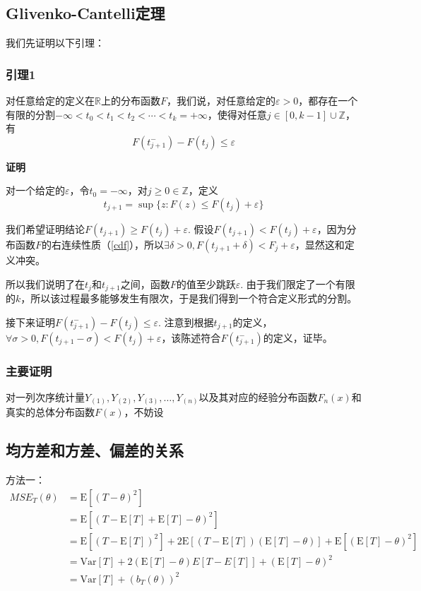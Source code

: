\documentclass[UTF8]{ctexbook}
\begin{document}
\subsection{Glivenko-Cantelli定理}
\label{proof:glivenko-cantelli}
我们先证明以下引理：

\subsubsection{引理1}

对任意给定的定义在$\mathbb{R}$上的分布函数$F$，我们说，对任意给定的$\varepsilon>0$，都存在一个有限的分割$-\infty<t_0<t_1<t_2<\cdots<t_k=+\infty$，使得对任意$j\in[0,k-1]\cup\mathbb{Z}$，有
\[
	F(t_{j+1}^-)-F(t_j)\leq\varepsilon
\]

\noindent\textbf{证明}

对一个给定的$\varepsilon$，令$t_0=-\infty$，对$j\geq0\in\mathbb{Z}$，定义
\[
	t_{j+1}=\sup\{z:F(z)\leq F(t_j)+\varepsilon\}
\]

我们希望证明结论$F(t_{j+1})\geq F(t_j)+\varepsilon$. 假设$F(t_{j+1})< F(t_j)+\varepsilon$，因为分布函数$F$的右连续性质（\ref{cdf}），所以$\exists\delta>0,F(t_{j+1}+\delta)<F_j+\varepsilon$，显然这和定义冲突。

所以我们说明了在$t_{j}$和$t_{j+1}$之间，函数$F$的值至少跳跃$\varepsilon$. 由于我们限定了一个有限的$k$，所以该过程最多能够发生有限次，于是我们得到一个符合定义形式的分割。

接下来证明$F(t_{j+1}^-)-F(t_j)\leq\varepsilon$. 注意到根据$t_{j+1}$的定义，$\forall\sigma>0,F(t_{j+1}-\sigma)<F(t_j)+\varepsilon$，该陈述符合$F(t^-_{j+1})$的定义，证毕。

\subsubsection{主要证明}

对一列次序统计量$Y_{(1)},Y_{(2)},Y_{(3)},\dots,Y_{(n)}$以及其对应的经验分布函数$F_n(x)$和真实的总体分布函数$F(x)$，不妨设

\subsection{均方差和方差、偏差的关系}
\label{proof1}
方法一：
\begin{align*}
	MSE_T(\theta)&=\mathrm{E}[(T-\theta)^2] \\
	&=\mathrm{E}[(T-\mathrm{E}[T]+\mathrm{E}[T]-\theta)^2]\\
	&=\mathrm{E}[(T-\mathrm{E}[T])^2]+2\mathrm{E}[(T-\mathrm{E}[T])(\mathrm{E}[T]-\theta)]+\mathrm{E}[(\mathrm{E}[T]-\theta)^2]\\
	&=\mathrm{Var}[T]+2(\mathrm{E}[T]-\theta)E[T-E[T]]+(\mathrm{E}[T]-\theta)^2\\
	&=\mathrm{Var}[T]+(b_T(\theta))^2
\end{align*}
\end{document}
